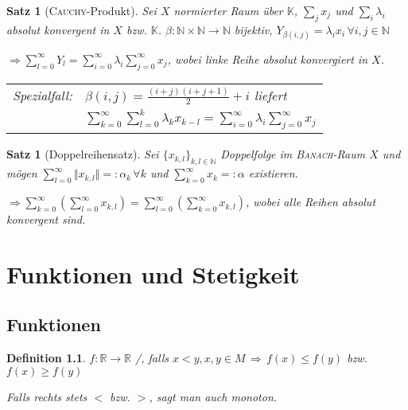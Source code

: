 \documentclass[ngerman,a4paper]{report}
\theoremstyle{break}
\newtheorem{satz}[theorem]{Satz}
\newtheorem*{definition}{Definition}
\newcommand{\person}[1]{\textsc{#1}}
\newcommand{\highlight}[1]{\emph{#1}}
\begin{document}
\begin{satz}[\person{Cauchy}-Produkt]
	Sei $X$ normierter Raum über $\mathbb{K}$, $\sum_j x_j$ und $\sum_i \lambda_i$ absolut konvergent in $X$ bzw. $\mathbb{K}$. $\beta:\mathbb{N}\times \mathbb{N}\rightarrow \mathbb{N}$ bijektiv, $Y_{\beta(i,j)} = \lambda_i x_i\,\forall i,j\in\mathbb{N}$
	
	$\Rightarrow \sum_{l=0}^\infty Y_l = \sum_{i=0}^\infty \lambda_i \sum_{j=0}^\infty x_j$, wobei linke Reihe absolut konvergiert in $X$.
	
	\begin{tabular}{ll}
		\highlight{Spezialfall:} & $\beta(i,j) = \frac{(i+j)(i+j+1)}{2} + i$ liefert\\[5pt]
		& $\sum_{k=0}^\infty \sum_{l=0}^k \lambda_k x_{k-l} = \sum_{i=0}^\infty \lambda_i \sum_{j=0}^\infty x_j$
	\end{tabular}
\end{satz}
\begin{satz}[Doppelreihensatz]
	Sei $\{x_{k,l}\}_{k,l\in\mathbb{N}}$ Doppelfolge im \person{Banach}-Raum $X$ und mögen $\sum_{l=0}^\infty \Vert x_{k,l}\Vert =:\alpha_k\,\forall k$ und $\sum_{k=0}^\infty x_k =: \alpha$ existieren.
	
	$\Rightarrow \sum_{k=0}^\infty \left(\sum_{l=0}^\infty x_{k,l}\right) = \sum_{l=0}^{\infty}\left( \sum_{k=0}^\infty x_{k,l}\right)$, wobei alle Reihen absolut konvergent sind.
\end{satz}

\chapter{Funktionen und Stetigkeit}\addtocounter{section}{12}
\section{Funktionen}
\begin{definition}
	$f:\mathbb{R}\to \mathbb{R}$ /, falls $x < y, x,y\in M \,\Rightarrow \,f(x) \le f(y)$ bzw. $f(x) \ge f(y)$
	
	Falls rechts stets $<$ bzw. $>$, sagt man auch  monoton.
\end{definition}
\end{document}
